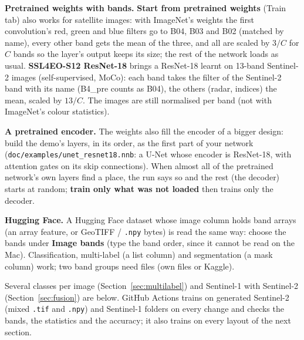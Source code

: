 \documentclass[11pt,a4paper]{article}
\newcommand{\ui}[1]{\textbf{\textsf{#1}}}
\newcommand{\file}[1]{\texttt{#1}}
\begin{document}
\textbf{Pretrained weights with bands.} \ui{Start from pretrained weights} (Train tab) also works for satellite images: with ImageNet's
weights the first convolution's red, green and blue filters go to B04, B03 and B02 (matched by name), every other band gets the mean of the
three, and all are scaled by $3/C$ for $C$ bands so the layer's output keeps its size; the rest of the network loads as usual.
\ui{SSL4EO-S12 ResNet-18} brings a ResNet-18 learnt on 13-band Sentinel-2 images (self-supervised, MoCo): each band takes the filter of the
Sentinel-2 band with its name (B4\_pre counts as B04), the others (radar, indices) the mean, scaled by $13/C$. The images are still
normalised per band (not with ImageNet's colour statistics).

\textbf{A pretrained encoder.} The weights also fill the encoder of a bigger design: build the demo's layers, in its order, as the first
part of your network (\file{doc/examples/unet\_resnet18.nnb}: a U-Net whose encoder is ResNet-18, with attention gates on its skip
connections). When almost all of the pretrained network's own layers find a place, the run says so and the rest (the decoder) starts
at random; \ui{train only what was not loaded} then trains only the decoder.

\textbf{Hugging Face.} A Hugging Face dataset whose image column holds band arrays (an array feature, or GeoTIFF / \file{.npy} bytes)
is read the same way: choose the bands under \ui{Image bands} (type the band order, since it cannot be read on the Mac). Classification,
multi-label (a list column) and segmentation (a mask column) work; two band groups need files (own files or Kaggle).

Several classes per image (Section~\ref{sec:multilabel}) and Sentinel-1 with Sentinel-2 (Section~\ref{sec:fusion}) are below.
GitHub Actions trains on generated Sentinel-2 (mixed \file{.tif} and \file{.npy}) and Sentinel-1 folders on every change and checks the
bands, the statistics and the accuracy; it also trains on every layout of the next section.
\end{document}
